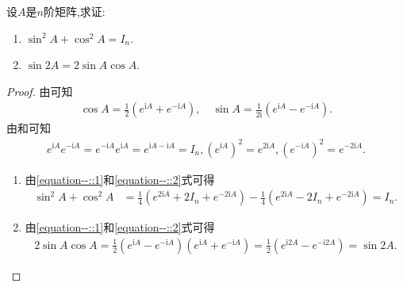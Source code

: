 \documentclass[../../main.tex]{subfiles}
\begin{document}
\begin{proposition}[矩阵三角函数的性质]\label{proposition:矩阵三角函数的性质}
设$A$是$n$阶矩阵,求证:
\begin{enumerate}[(1)]
\item  $\sin^2 A+\cos^2 A = I_n$.

\item $\sin 2A = 2\sin A\cos A$.
\end{enumerate}
\end{proposition}
\begin{proof}
由可知
\begin{align}\label{equation--::1}
\cos A = \frac{1}{2}(e^{\mathrm{i}A}+e^{-\mathrm{i}A}),
\quad
\sin A = \frac{1}{2\mathrm{i}}(e^{\mathrm{i}A}-e^{-\mathrm{i}A}).
\end{align}
由和可知
\begin{align}\label{equation--::2}
e^{\mathrm{i}A}e^{-\mathrm{i}A}=e^{-\mathrm{i}A}e^{\mathrm{i}A}=e^{\mathrm{i}A - \mathrm{i}A}=I_n,(e^{\mathrm{i}A})^2 = e^{2\mathrm{i}A},(e^{-\mathrm{i}A})^2 = e^{-2\mathrm{i}A}.
\end{align}
\begin{enumerate}[(1)]
\item 由\eqref{equation--::1}和\eqref{equation--::2}式可得
\begin{align*}
\sin^2 A+\cos^2 A &= \frac{1}{4}(e^{2\mathrm{i}A}+2I_n + e^{-2\mathrm{i}A}) - \frac{1}{4}(e^{2\mathrm{i}A}-2I_n + e^{-2\mathrm{i}A}) = I_n.
\end{align*}

\item 由\eqref{equation--::1}和\eqref{equation--::2}式可得
\begin{align*}
2\sin A\cos A=\frac{1}{2}\left( e^{\mathrm{i}A}-e^{-\mathrm{i}A} \right) \left( e^{\mathrm{i}A}+e^{-\mathrm{i}A} \right) =\frac{1}{2}\left( e^{\mathrm{i}2A}-e^{-\mathrm{i}2A} \right) =\sin 2A.    
\end{align*}
\end{enumerate}
\end{proof}
\end{document}
